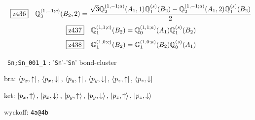 \documentclass[fleqn,10pt,landscape]{jsarticle}
\begin{document}
\begin{dmath*}
\hspace*{3mm}\fbox{z436}\quad \mathbb{Q}_{3}^{(1,-1;c)}(B_{2},2)=\frac{\sqrt{3} \mathbb{Q}_{2}^{(1,-1;a)}(A_{1},1) \mathbb{Q}_{1}^{(s)}(B_{2}) - \mathbb{Q}_{2}^{(1,-1;a)}(A_{1},2) \mathbb{Q}_{1}^{(s)}(B_{2})}{2}
\end{dmath*}
\begin{dmath*}
\hspace*{3mm}\fbox{z437}\quad \mathbb{Q}_{1}^{(1,1;c)}(B_{2})=\mathbb{Q}_{0}^{(1,1;a)}(A_{1}) \mathbb{Q}_{1}^{(s)}(B_{2})
\end{dmath*}
\begin{dmath*}
\hspace*{3mm}\fbox{z438}\quad \mathbb{G}_{1}^{(1,0;c)}(B_{2})=\mathbb{G}_{1}^{(1,0;a)}(B_{2}) \mathbb{Q}_{0}^{(s)}(A_{1})
\end{dmath*}
\vspace{5mm}

\noindent\textbullet\, \texttt{Sn;Sn_001_1} : '\texttt{Sn}'-'\texttt{Sn}' bond-cluster

\noindent\quad * bra: $\bra{p_{x},\uparrow},\, \bra{p_{x},\downarrow},\, \bra{p_{y},\uparrow},\, \bra{p_{y},\downarrow},\, \bra{p_{z},\uparrow},\, \bra{p_{z},\downarrow}$

\noindent\quad * ket: $\ket{p_{x},\uparrow},\, \ket{p_{x},\downarrow},\, \ket{p_{y},\uparrow},\, \ket{p_{y},\downarrow},\, \ket{p_{z},\uparrow},\, \ket{p_{z},\downarrow}$

\noindent\quad * wyckoff: \texttt{4a@4b}
\end{document}
